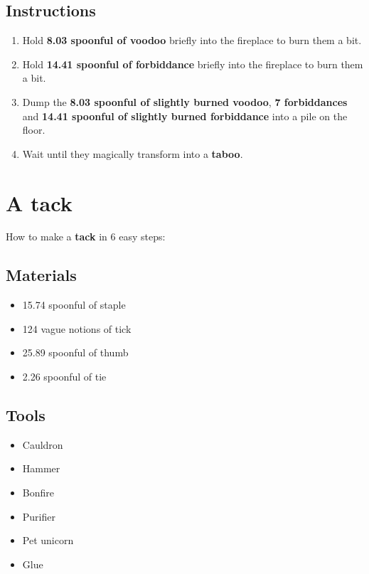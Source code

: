 \documentclass{article}
\begin{document}
\subsection{Instructions}\begin{enumerate}
\item 
Hold \textbf{8.03 spoonful of voodoo} briefly into the fireplace to burn them a bit.
\item 
Hold \textbf{14.41 spoonful of forbiddance} briefly into the fireplace to burn them a bit.
\item 
Dump the \textbf{8.03 spoonful of slightly burned voodoo}, \textbf{7 forbiddances} and \textbf{14.41 spoonful of slightly burned forbiddance} into a pile on the floor.
\item 
Wait until they magically transform into a \textbf{taboo}.
\end{enumerate}
\newpage
\section{A tack}How to make a \textbf{tack} in 6 easy steps:

\subsection{Materials}\begin{itemize}
\item 
15.74 spoonful of staple
\item 
124 vague notions of tick
\item 
25.89 spoonful of thumb
\item 
2.26 spoonful of tie
\end{itemize}
\subsection{Tools}\begin{itemize}
\item 
Cauldron
\item 
Hammer
\item 
Bonfire
\item 
Purifier
\item 
Pet unicorn
\item 
Glue
\end{itemize}
\end{document}
